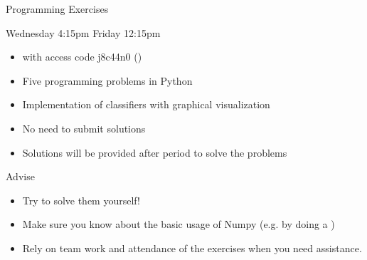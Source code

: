 \begin{frame}[t]{Programming Exercises}

    Wednesday 4:15pm  Friday 12:15pm

    \vspace{0.3cm}
    \begin{itemize}
        \setlength\itemsep{0.1cm}
        \item \href{https://teams.microsoft.com/l/team/19\%3ad1b741fa9b234318b83d6a50d3f22e0f\%40thread.tacv2/conversations?groupId=164543b9-54c7-4cdb-949a-37b423cd4158&tenantId=b2efcef3-8496-40b8-9de8-f135982f3461}{} with access code j8c44n0 (\href{https://www.anleitungen.rrze.fau.de/medien/ms-teams/}{})
        \item Five programming problems in Python
        \item Implementation of classifiers with graphical visualization
        \item No need to submit solutions
        \item Solutions will be provided after period to solve the problems

    \end{itemize}

    \vspace{0.3cm}
    \begin{block}{Advise}
        \begin{itemize}
            \setlength\itemsep{0.3cm}
            \item Try to solve them yourself!
            \item Make sure you know about the basic usage of Numpy (e.g. by doing a \href{https://sebastianraschka.com/blog/2020/numpy-intro.html}{})
            \item Rely on team work and attendance of the exercises when you need assistance.
        \end{itemize}
    \end{block}
\end{frame}

